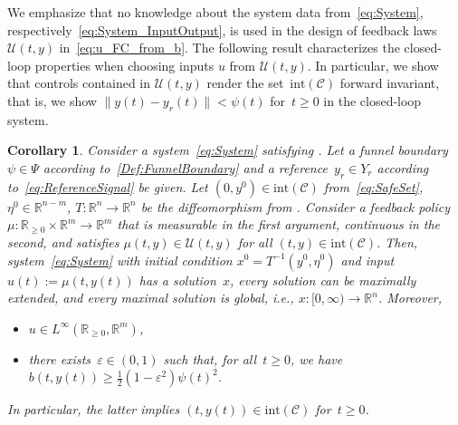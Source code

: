 \documentclass[journal,twoside,web]{ieeeconf}
\newcommand{\R}{\mathbb{R}}
\newtheorem{cor}{Corollary}
\begin{document}
%
%
We emphasize that no knowledge about the system data from~\eqref{eq:System}, respectively~\eqref{eq:System_InputOutput}, is used in the design of feedback laws~$\mathcal{U}(t,y)$ in~\eqref{eq:u_FC_from_b}. 
The following result characterizes the closed-loop properties when choosing inputs $u$ from $\mathcal{U}(t,y)$.
In particular, we show that controls contained in $\mathcal{U}(t,y)$ render the set~$\text{int}(\mathcal{C})$ forward invariant, that is, we show $\|y(t) - y_r(t)\| < \psi(t)$ for~$t\ge0$ in the closed-loop system.
%
\begin{cor}
\label{cor_funnel}
Consider a system~\eqref{eq:System} satisfying .
    Let a funnel boundary~$\psi \in \Psi$ according to~\eqref{Def:FunnelBoundary}
    and a reference~$y_r \in Y_r$ according to~\eqref{eq:ReferenceSignal} be given.
    Let  $(0,y^0) \in \textrm{int}(\mathcal{C})$ from~\eqref{eq:SafeSet}, $\eta^0\in\R^{n-m}$, 
    $T:\R^n\to\R^n$ be the diffeomorphism from . Consider a feedback policy $\mu:\R_{\geq0}\times\R^m\to\R^m$ that is measurable in the first argument, continuous in the second, and satisfies ${\mu(t,y)\in\mathcal{U}(t,y)}$ for all $(t,y)\in\mathrm{int}(\mathcal{C})$. 
Then, system~\eqref{eq:System} with initial condition $x^0 = T^{-1}(y^0,\eta^0)$  
and input $u(t):=\mu(t,y(t))$
    has a solution~$x$,
    every solution can be maximally extended,
    and every maximal solution is global, i.e., $x: [0,\infty) \to \R^n$.
    Moreover,
    \begin{itemize}
        \item[(i)] $u\in L^\infty(\R_{\ge 0},\R^m)$,
        \item[(ii)] there exists~$\varepsilon \in (0,1)$ such that, for all~$t \ge 0$, we have $b(t,y(t)) \ge \tfrac12 (1-\varepsilon^2)\psi(t)^2$.
    \end{itemize}
    In particular, the latter implies $(t,y(t))\in \mathrm{int}(\mathcal{C})$ for~$t \ge 0$.
\end{cor}
\end{document}
